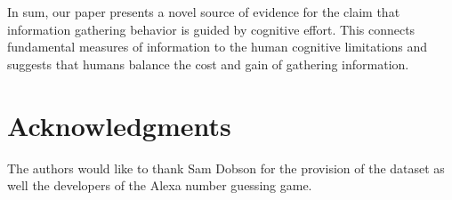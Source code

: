 \documentclass[10pt,letterpaper]{article}
\begin{document}
In sum, our paper presents a novel source of evidence for the claim that information gathering behavior is guided by cognitive effort. This connects fundamental measures of information to the human cognitive limitations and suggests that humans balance the cost and gain of gathering information. 

\section{Acknowledgments}
The authors would like to thank Sam Dobson for the provision of the dataset as well the developers of the Alexa number guessing game.

\vspace{2em}
\vspace{2em} \noindent


\setlength{\bibleftmargin}{.125in}
\setlength{\bibindent}{-\bibleftmargin}

\typeout{} 

\end{document}

